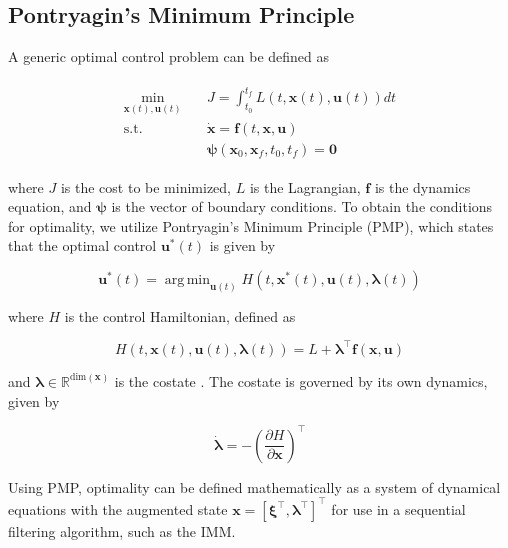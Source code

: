 \documentclass[letterpaper, preprint, paper,11pt]{AAS}	%
\DeclareMathOperator*{\argmin}{arg\,min}
\newcommand{\R}{\mathbb{R}}
\begin{document}
\subsection{Pontryagin's Minimum Principle}

A generic optimal control problem can be defined as

\begin{align}
\begin{split}
     \min_{\bm{x}(t), \bm{u}(t)} & \quad J = \int_{t_0}^{t_f} L(t, \bm{x}(t), \bm{u}(t)) dt \\
     \text{s.t.} & \quad  \dot{\bm{x}} = \bm{f}(t, \bm{x}, \bm{u}) \\
     & \quad \bm{\psi}(\bm{x}_0, \bm{x}_f, t_0, t_f) = \bm{0}
\end{split}
\end{align}

\noindent where $J$ is the cost to be minimized, $L$ is the Lagrangian, $\bm{f}$ is the dynamics equation, and $\bm{\psi}$ is the vector of boundary conditions. To obtain the conditions for optimality, we utilize Pontryagin's Minimum Principle (PMP), which states that the optimal control $\bm{u}^*(t)$ is given by

\begin{equation}
    \bm{u}^*(t) = \argmin_{\bm{u}(t)} H(t, \bm{x}^*(t), \bm{u}(t), \bm{\lambda}(t)) \label{PMP optimal control}
\end{equation}

\noindent where $H$ is the control Hamiltonian, defined as

\begin{equation}
    H(t, \bm{x}(t), \bm{u}(t), \bm{\lambda}(t)) = L + \bm{\lambda}^\top \bm{f}(\bm{x}, \bm{u}) \label{PMP Hamiltonian}
\end{equation}

\noindent and $\bm{\lambda} \in \R^{\text{dim}(\bm{x})}$ is the costate \cite{pontryagin1962}. The costate is governed by its own dynamics, given by

\begin{equation}
    \dot{\bm{\lambda}} = -\left(\frac{\partial H}{\partial\bm{x}} \right)^\top \label{PMP costate dynamics}
\end{equation}

Using PMP, optimality can be defined mathematically as a system of dynamical equations with the augmented state $\bm{x} = [\bm{\xi}^\top, \bm{\lambda}^\top]^\top$ for use in a sequential filtering algorithm, such as the IMM.
\end{document}
